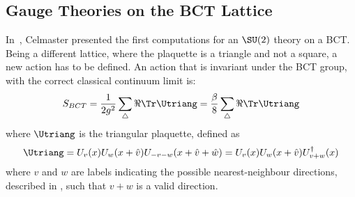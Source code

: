 \subsection{Gauge Theories on the BCT Lattice\label{Sec3:BCTlatticeGaugeTheories}}
In~\cite{Celmaster:1982ht}, Celmaster presented the first computations for an $\SU(2)$ theory on a BCT.
Being a different lattice, where the plaquette is a triangle and not a square, a new action has to be defined. An action that is invariant under the BCT group, with the correct classical continuum limit is:
\begin{equation}
    S_{BCT} = \frac1{2g^2} \sum_\bigtriangleup \Re\Tr \Utriang = \frac\beta8 \sum_\bigtriangleup \Re\Tr \Utriang \label{3:BCTAction}
\end{equation}
where $\Utriang$ is the triangular plaquette, defined as
\begin{equation}
    \Utriang = U_v(x)U_w(x+\hat{v})U_{-v-w}(x+\hat{v}+\hat{w}) = U_v(x)U_w(x+\hat{v})U^\dagger_{v+w}(x) \label{3:PlaqTriang}
\end{equation}
where $v$ and $w$ are labels indicating the possible nearest-neighbour directions, described in , such that $v+w$ is a valid direction.
\begin{comment}
\begin{figure}[!hbtp]
    \centering
    \begin{tikzpicture}
        \filldraw[black]  (0,0) circle (3pt) node[anchor=north east]{$x$};
        \filldraw[black]  (2,0) circle (3pt) node[anchor=north west]{$x+\hat{v}$};
        \filldraw[black]  (1,1.732) circle (3pt) node[anchor=south]{$x+\hat{v}+\hat{w}$};
        \draw[ultra thick,->] (0,0) -- (1,0) node[anchor=north]{$U_v(x)$};
        \draw[ultra thick   ] (1,0) -- (2,0);
        \draw[ultra thick,->] (2,0) -- (1.5,0.866) node[anchor=south west]{$U_w(x+\hat{v})$};
        \draw[ultra thick   ] (1.5,0.866) -- (1,1.732);
        \draw[ultra thick,->] (1,1.732) -- (0.5,0.866) node[anchor=south east]{$U^\dagger_{v+w}(x)$};
        \draw[ultra thick   ] (0.5,0.866) -- (0,0);
    \end{tikzpicture}
    \caption{Schematization of an elementary triangular plaquette.}
    \label{3F:PlaqTriang}
\end{figure}\\
\end{comment}
